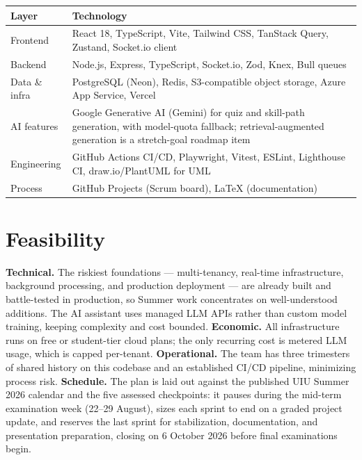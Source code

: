 \documentclass[11pt, a4paper]{article}
\begin{document}
\begin{center}
\begin{tabular}{p{4cm}p{9.7cm}}
    \toprule
    \textbf{Layer} & \textbf{Technology} \\
    \midrule
    Frontend & React 18, TypeScript, Vite, Tailwind CSS, TanStack Query,
    Zustand, Socket.io client \\
    Backend & Node.js, Express, TypeScript, Socket.io, Zod, Knex, Bull
    queues \\
    Data \& infra & PostgreSQL (Neon), Redis, S3-compatible object storage,
    Azure App Service, Vercel \\
    AI features & Google Generative AI (Gemini) for quiz and skill-path
    generation, with model-quota fallback; retrieval-augmented generation
    is a stretch-goal roadmap item \\
    Engineering & GitHub Actions CI/CD, Playwright, Vitest, ESLint,
    Lighthouse CI, draw.io/PlantUML for UML \\
    Process & GitHub Projects (Scrum board), LaTeX (documentation) \\
    \bottomrule
\end{tabular}
\end{center}

\section{Feasibility}

\textbf{Technical.} The riskiest foundations --- multi-tenancy, real-time
infrastructure, background processing, and production deployment --- are
already built and battle-tested in production, so Summer work concentrates
on well-understood additions. The AI assistant uses managed LLM APIs rather
than custom model training, keeping complexity and cost bounded.
\textbf{Economic.} All infrastructure runs on free or student-tier cloud
plans; the only recurring cost is metered LLM usage, which is capped
per-tenant. \textbf{Operational.} The team has three trimesters of shared
history on this codebase and an established CI/CD pipeline, minimizing
process risk. \textbf{Schedule.} The plan is laid out against the published UIU Summer 2026
calendar and the five assessed checkpoints: it pauses during the mid-term
examination week (22--29 August), sizes each sprint to end on a graded
project update, and reserves the last sprint for stabilization,
documentation, and presentation preparation, closing on 6 October 2026
before final examinations begin.
\end{document}
